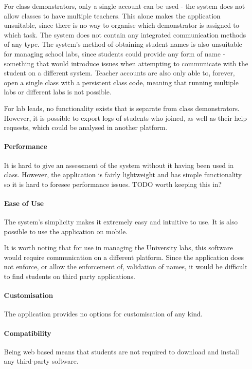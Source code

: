 For class demonstrators, only a single account can be used - the system does not allow classes to have multiple teachers. This alone makes the application unsuitable, since there is no way to organise which demonstrator is assigned to which task. The system does not contain any integrated communication methods of any type. The system's method of obtaining student names is also unsuitable for managing school labs, since students could provide any form of name - something that would introduce issues when attempting to communicate with the student on a different system. Teacher accounts are also only able to, forever, open a single class with a persistent class code, meaning that running multiple labs or different labs is not possible.

For lab leads, no functionality exists that is separate from class demonstrators. However, it is possible to export logs of students who joined, as well as their help requests, which could be analysed in another platform.


\paragraph{Performance}  
It is hard to give an assessment of the system without it having been used in class. However, the application is fairly lightweight and has simple functionality so it is hard to foresee performance issues. TODO worth keeping this in?

\paragraph{Ease of Use}
The system's simplicity makes it extremely easy and intuitive to use. It is also possible to use the application on mobile. 

It is worth noting that for use in managing the University labs, this software would require communication on a different platform. Since the application does not enforce, or allow the enforcement of, validation of names, it would be difficult to find students on third party applications.


\paragraph{Customisation} 
The application provides no options for customisation of any kind.


\paragraph{Compatibility}  
Being web based means that students are not required to download and install any third-party software. 


